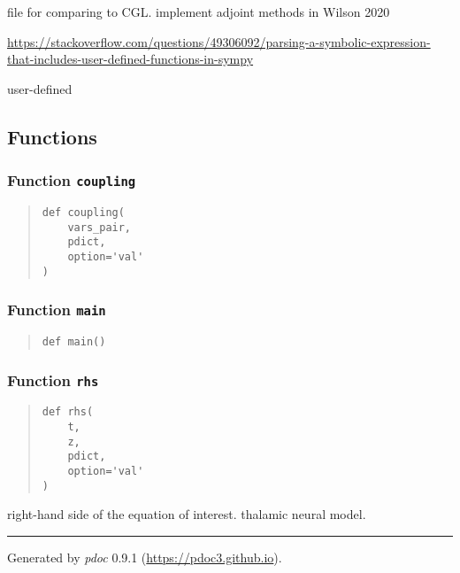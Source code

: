 \documentclass[
  english,
  a4paper,
  oneside]{article}
\begin{document}
file for comparing to CGL. implement adjoint methods in Wilson 2020

\url{https://stackoverflow.com/questions/49306092/parsing-a-symbolic-expression-that-includes-user-defined-functions-in-sympy}

user-defined

\hypertarget{functions-2}{%
\subsection{Functions}\label{functions-2}}

\hypertarget{Thalamic.coupling}{%
\subsubsection{\texorpdfstring{Function
\texttt{coupling}}{Function coupling}}\label{Thalamic.coupling}}

\begin{quote}
\begin{verbatim}
def coupling(
    vars_pair,
    pdict,
    option='val'
)
\end{verbatim}
\end{quote}

\hypertarget{Thalamic.main}{%
\subsubsection{\texorpdfstring{Function
\texttt{main}}{Function main}}\label{Thalamic.main}}

\begin{quote}
\begin{verbatim}
def main()
\end{verbatim}
\end{quote}

\hypertarget{Thalamic.rhs}{%
\subsubsection{\texorpdfstring{Function
\texttt{rhs}}{Function rhs}}\label{Thalamic.rhs}}

\begin{quote}
\begin{verbatim}
def rhs(
    t,
    z,
    pdict,
    option='val'
)
\end{verbatim}
\end{quote}

right-hand side of the equation of interest. thalamic neural model.

\begin{center}\rule{0.5\linewidth}{\linethickness}\end{center}

Generated by \emph{pdoc} 0.9.1 (\url{https://pdoc3.github.io}).
\end{document}
